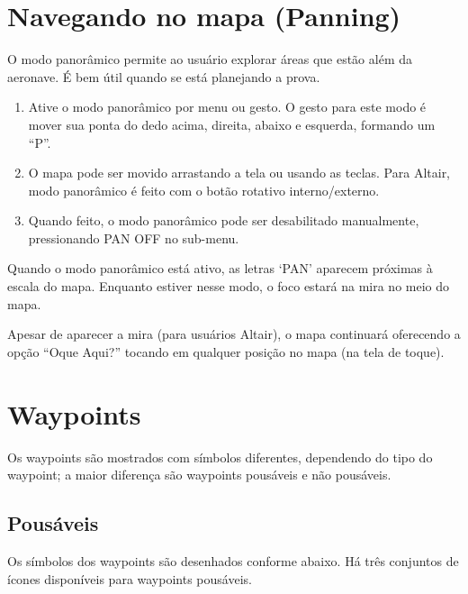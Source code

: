 \section{Navegando no mapa (Panning)}\label{sec:panning}

O modo panorâmico permite ao usuário explorar áreas que estão além da aeronave.  É bem útil quando se está planejando a prova.
\begin{enumerate}
\item Ative o modo panorâmico por menu ou gesto.  O gesto para este modo é mover sua ponta do dedo acima, direita, abaixo e esquerda, formando um “P”. 
\item O mapa pode ser movido arrastando a tela ou usando as teclas.  Para Altair, modo panorâmico é feito com o botão rotativo interno/externo.  
\item Quando feito, o modo panorâmico pode ser desabilitado manualmente, pressionando PAN OFF no sub-menu.
\end{enumerate} 

Quando o modo panorâmico está ativo, as letras ‘PAN’ aparecem próximas à escala do mapa.  Enquanto estiver nesse modo, o foco estará na mira no meio do mapa.

Apesar de aparecer a mira (para usuários Altair), o mapa continuará oferecendo a opção “Oque Aqui?” tocando em qualquer posição no mapa (na tela de toque). 


\section{Waypoints} \label{sec:waypoint-schemes}
Os waypoints são mostrados com símbolos diferentes, dependendo do tipo do waypoint; a maior diferença são waypoints pousáveis e não pousáveis.

\subsection*{Pousáveis}
Os símbolos dos waypoints são desenhados conforme abaixo.  Há três conjuntos de ícones disponíveis para waypoints pousáveis. 

